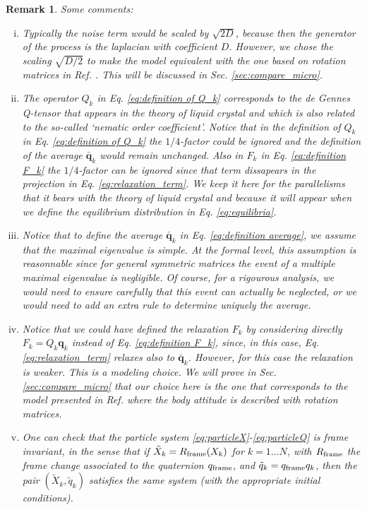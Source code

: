 \documentclass[12pt]{article}
\newtheorem{remark}[theorem]{Remark}
\newcommand{\qk}{\mathbf{q}_k}
\newcommand{\bqk}{\bar{\mathbf{q}}_k}
\begin{document}
\begin{remark} Some comments:
\begin{enumerate}[(i)]
\setlength\itemsep{0em}
\item Typically the noise term would be scaled by $\sqrt{2D}$, because then the generator of the process is the laplacian with coefficient $D$. However, we chose the scaling $\sqrt{D/2}$ to make the model equivalent with the one based on rotation matrices in Ref. \cite{bodyattitude}. This will be discussed in Sec. \ref{sec:compare_micro}.
\item The operator $Q_k$ in Eq. \eqref{eq:definition of Q_k} corresponds to the de Gennes Q-tensor that appears in the theory of liquid crystal \cite{doi1988theory} and which is also related to the so-called `nematic order coefficient'. Notice that in the definition of $Q_k$ in Eq. \eqref{eq:definition of Q_k} the $1/4$-factor could be ignored and the definition of the average $\bqk$ would remain unchanged. Also in $F_k$ in Eq. \eqref{eq:definition F_k} the $1/4$-factor can be ignored since that term dissapears in the projection  in Eq. \eqref{eq:relaxation_term}. We keep it here for the parallelisms that it bears with the theory of liquid crystal and because it will appear when we define the equilibrium distribution in Eq. \eqref{eq:equilibria}.

\item Notice that to define the average $\bqk$ in Eq. \eqref{eq:definition average}, we assume that the maximal eigenvalue is \emph{simple}. At the formal level, this assumption is reasonnable since for general symmetric matrices the event of a multiple maximal eigenvalue is negligible. Of course, for a rigourous analysis, we would need to ensure carefully that this event can actually be neglected, or we would need to add an extra rule to determine uniquely the average.
\item Notice that we could have defined the relaxation $F_k$ by considering directly $F_k=Q_k \qk$ instead of Eq. \eqref{eq:definition F_k}, since, in this case, Eq. \eqref{eq:relaxation_term} relaxes also to $\bqk$. However, for this case the relaxation is weaker. This is a modeling choice. We will prove in Sec. \ref{sec:compare_micro} that our choice here is the one that corresponds to the model presented in Ref. \cite{bodyattitude} where the body attitude is described with rotation matrices.
\item One can check that the particle system \eqref{eq:particleX}-\eqref{eq:particleQ} is frame invariant, in the sense that if $\tilde{X}_k=R_{\textnormal{frame}}(X_k)$ for $k=1\dots N$, with $R_{\textnormal{frame}}$ the frame change associated to the quaternion $q_{\textnormal{frame}}$, and $\tilde{q}_k=q_{\textnormal{frame}}q_k$, then the pair $(\tilde{X}_k, \tilde{q}_k)$ satisfies the same system (with the appropriate initial conditions).

\end{enumerate}
\end{remark} 
 
\end{document}
